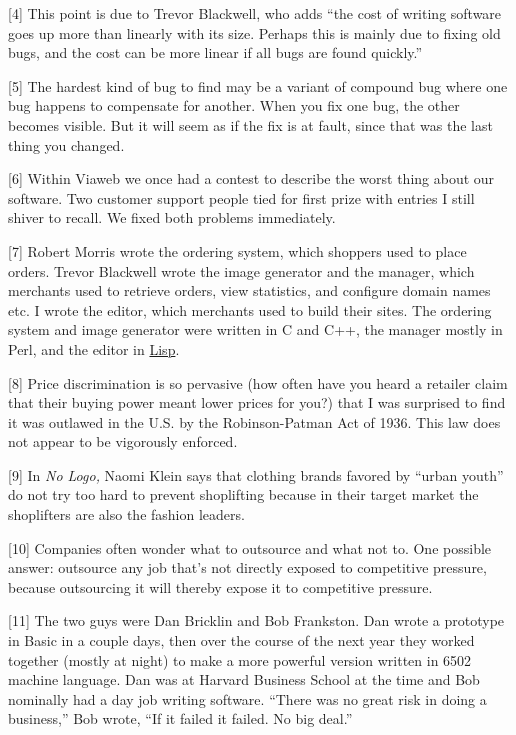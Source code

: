 {[}4{]} This point is due to Trevor Blackwell, who adds ``the cost of
writing software goes up more than linearly with its size. Perhaps this
is mainly due to fixing old bugs, and the cost can be more linear if all
bugs are found quickly.''

{[}5{]} The hardest kind of bug to find may be a variant of compound bug
where one bug happens to compensate for another. When you fix one bug,
the other becomes visible. But it will seem as if the fix is at fault,
since that was the last thing you changed.

{[}6{]} Within Viaweb we once had a contest to describe the worst thing
about our software. Two customer support people tied for first prize
with entries I still shiver to recall. We fixed both problems
immediately.

{[}7{]} Robert Morris wrote the ordering system, which shoppers used to
place orders. Trevor Blackwell wrote the image generator and the
manager, which merchants used to retrieve orders, view statistics, and
configure domain names etc. I wrote the editor, which merchants used to
build their sites. The ordering system and image generator were written
in C and C++, the manager mostly in Perl, and the editor in
\href{avg.html}{Lisp}.

{[}8{]} Price discrimination is so pervasive (how often have you heard a
retailer claim that their buying power meant lower prices for you?) that
I was surprised to find it was outlawed in the U.S. by the
Robinson-Patman Act of 1936. This law does not appear to be vigorously
enforced.

{[}9{]} In \emph{No Logo,} Naomi Klein says that clothing brands favored
by ``urban youth'' do not try too hard to prevent shoplifting because in
their target market the shoplifters are also the fashion leaders.

{[}10{]} Companies often wonder what to outsource and what not to. One
possible answer: outsource any job that's not directly exposed to
competitive pressure, because outsourcing it will thereby expose it to
competitive pressure.

{[}11{]} The two guys were Dan Bricklin and Bob Frankston. Dan wrote a
prototype in Basic in a couple days, then over the course of the next
year they worked together (mostly at night) to make a more powerful
version written in 6502 machine language. Dan was at Harvard Business
School at the time and Bob nominally had a day job writing software.
``There was no great risk in doing a business,'' Bob wrote, ``If it
failed it failed. No big deal.''

